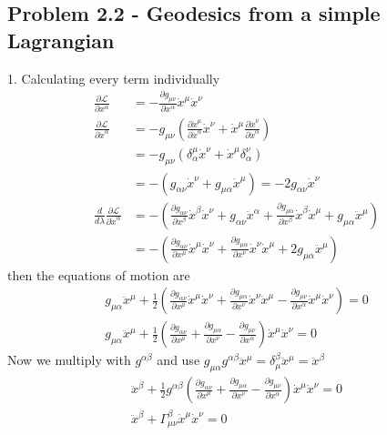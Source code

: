 \documentclass[10pt,a4paper]{book}
\theoremstyle{definition}
\begin{document}
\subsection{Problem 2.2 - Geodesics from a simple Lagrangian}
1. Calculating every term individually
\begin{align}
\frac{\partial\mathcal{L}}{\partial x^\alpha}
&=-\frac{\partial g_{\mu\nu}}{\partial x^\alpha}\dot{x}^\mu\dot{x}^\nu\\
\frac{\partial\mathcal{L}}{\partial \dot{x}^\alpha}
&=-g_{\mu\nu}\left(\frac{\partial\dot{x}^\mu}{\partial\dot{x}^\alpha}\dot{x}^\nu+\dot{x}^\mu\frac{\partial\dot{x}^\nu}{\partial\dot{x}^\alpha}\right)\\
&=-g_{\mu\nu}\left(\delta^\mu_\alpha\dot{x}^\nu+\dot{x}^\mu\delta^\nu_\alpha\right)\\
&=-(g_{\alpha\nu}\dot{x}^\nu+g_{\mu\alpha}\dot{x}^\mu)=-2g_{\alpha\nu}\dot{x}^\nu\\
\frac{d}{d\lambda}\frac{\partial\mathcal{L}}{\partial \dot{x}^\alpha}
&=-\left(\frac{\partial g_{\alpha\nu}}{\partial x^\beta}\dot{x}^\beta\dot{x}^\nu+g_{\alpha\nu}\ddot{x}^\alpha+\frac{\partial g_{\mu\alpha}}{\partial x^\beta}\dot{x}^\beta\dot{x}^\mu+g_{\mu\alpha}\ddot{x}^\mu\right)\\
&=-\left(\frac{\partial g_{\alpha\nu}}{\partial x^\mu}\dot{x}^\mu\dot{x}^\nu
+\frac{\partial g_{\mu\alpha}}{\partial x^\nu}\dot{x}^\nu\dot{x}^\mu
+2g_{\mu\alpha}\ddot{x}^\mu\right)
\end{align}
then the equations of motion are
\begin{align}
g_{\mu\alpha}\ddot{x}^\mu+\frac{1}{2}\left(\frac{\partial g_{\alpha\nu}}{\partial x^\mu}\dot{x}^\mu\dot{x}^\nu
+\frac{\partial g_{\mu\alpha}}{\partial x^\nu}\dot{x}^\nu\dot{x}^\mu-\frac{\partial g_{\mu\nu}}{\partial x^\alpha}\dot{x}^\mu\dot{x}^\nu\right)=0\\
g_{\mu\alpha}\ddot{x}^\mu+\frac{1}{2}\left(\frac{\partial g_{\alpha\nu}}{\partial x^\mu}
+\frac{\partial g_{\mu\alpha}}{\partial x^\nu}-\frac{\partial g_{\mu\nu}}{\partial x^\alpha}\right)\dot{x}^\mu\dot{x}^\nu=0
\end{align}
Now we multiply with $g^{\alpha\beta}$ and use $g_{\mu\alpha}g^{\alpha\beta}\ddot{x}^\mu=\delta^\beta_\mu\ddot{x}^\mu=\ddot{x}^\beta$
\begin{align}
\ddot{x}^\beta+\frac{1}{2}g^{\alpha\beta}\left(\frac{\partial g_{\alpha\nu}}{\partial x^\mu}
+\frac{\partial g_{\mu\alpha}}{\partial x^\nu}-\frac{\partial g_{\mu\nu}}{\partial x^\alpha}\right)\dot{x}^\mu\dot{x}^\nu=0\\
\ddot{x}^\beta+\Gamma^\beta_{\mu\nu}\dot{x}^\mu\dot{x}^\nu=0
\end{align}
\end{document}
